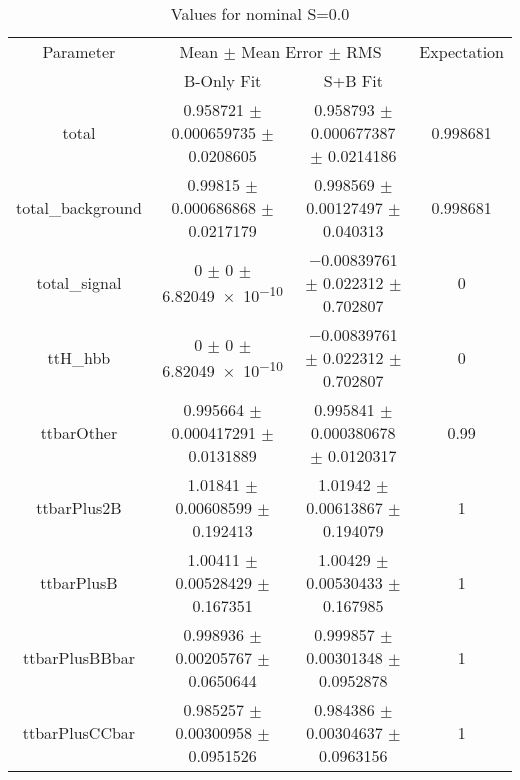\begin{table}
\centering
\caption{Values for nominal S=0.0}
\begin{tabular}{cccc}
\toprule
Parameter & \multicolumn{2}{c}{Mean $\pm$ Mean Error $\pm$ RMS} & Expectation\\
 & B-Only Fit & S+B Fit & \\
\midrule
total & \num{0.958721} $\pm$ \num{0.000659735} $\pm$ \num{0.0208605} & \num{0.958793} $\pm$ \num{0.000677387} $\pm$ \num{0.0214186} & \num{0.998681}\\
total\_background & \num{0.99815} $\pm$ \num{0.000686868} $\pm$ \num{0.0217179} & \num{0.998569} $\pm$ \num{0.00127497} $\pm$ \num{0.040313} & \num{0.998681}\\
total\_signal & \num{0} $\pm$ \num{0} $\pm$ \num{6.82049e-10} & \num{-0.00839761} $\pm$ \num{0.022312} $\pm$ \num{0.702807} & \num{0}\\
ttH\_hbb & \num{0} $\pm$ \num{0} $\pm$ \num{6.82049e-10} & \num{-0.00839761} $\pm$ \num{0.022312} $\pm$ \num{0.702807} & \num{0}\\
ttbarOther & \num{0.995664} $\pm$ \num{0.000417291} $\pm$ \num{0.0131889} & \num{0.995841} $\pm$ \num{0.000380678} $\pm$ \num{0.0120317} & \num{0.99}\\
ttbarPlus2B & \num{1.01841} $\pm$ \num{0.00608599} $\pm$ \num{0.192413} & \num{1.01942} $\pm$ \num{0.00613867} $\pm$ \num{0.194079} & \num{1}\\
ttbarPlusB & \num{1.00411} $\pm$ \num{0.00528429} $\pm$ \num{0.167351} & \num{1.00429} $\pm$ \num{0.00530433} $\pm$ \num{0.167985} & \num{1}\\
ttbarPlusBBbar & \num{0.998936} $\pm$ \num{0.00205767} $\pm$ \num{0.0650644} & \num{0.999857} $\pm$ \num{0.00301348} $\pm$ \num{0.0952878} & \num{1}\\
ttbarPlusCCbar & \num{0.985257} $\pm$ \num{0.00300958} $\pm$ \num{0.0951526} & \num{0.984386} $\pm$ \num{0.00304637} $\pm$ \num{0.0963156} & \num{1}\\
\bottomrule
\end{tabular}
\end{table}
